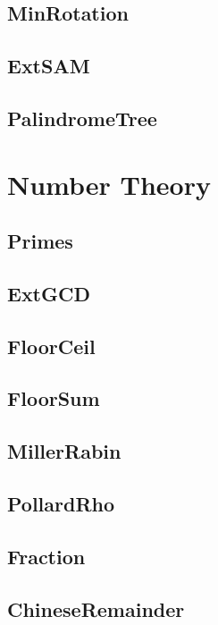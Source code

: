 \subsection{MinRotation}

\subsection{ExtSAM}

\subsection{PalindromeTree}

\section{Number Theory}
\subsection{Primes}

\subsection{ExtGCD}

\subsection{FloorCeil}

\subsection{FloorSum}


\subsection{MillerRabin}

\subsection{PollardRho}

\subsection{Fraction}

\subsection{ChineseRemainder}

